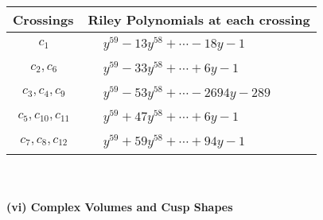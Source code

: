 \documentclass[1p]{elsarticle_modified}
\theoremstyle{definition}
\begin{document}
\begin{tabular}{m{50pt}|m{274pt}}
Crossings & \hspace{64pt}Riley Polynomials at each crossing \\
\hline $$\begin{aligned}c_{1}\end{aligned}$$&$\begin{aligned}
&y^{59}-13 y^{58}+\cdots-18 y-1
\end{aligned}$\\
\hline $$\begin{aligned}c_{2},c_{6}\end{aligned}$$&$\begin{aligned}
&y^{59}-33 y^{58}+\cdots+6 y-1
\end{aligned}$\\
\hline $$\begin{aligned}c_{3},c_{4},c_{9}\end{aligned}$$&$\begin{aligned}
&y^{59}-53 y^{58}+\cdots-2694 y-289
\end{aligned}$\\
\hline $$\begin{aligned}c_{5},c_{10},c_{11}\end{aligned}$$&$\begin{aligned}
&y^{59}+47 y^{58}+\cdots+6 y-1
\end{aligned}$\\
\hline $$\begin{aligned}c_{7},c_{8},c_{12}\end{aligned}$$&$\begin{aligned}
&y^{59}+59 y^{58}+\cdots+94 y-1
\end{aligned}$\\
\hline
\end{tabular}\\~\\
\newpage\flushleft \textbf{(vi) Complex Volumes and Cusp Shapes}
\end{document}
